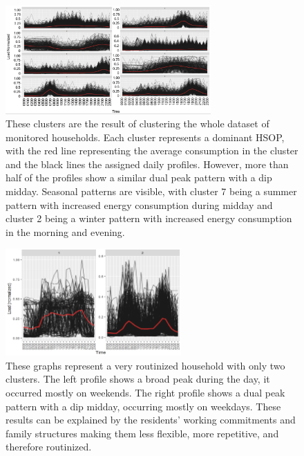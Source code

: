 \begin{figure}
    \centering
    \includegraphics[width=0.7\textwidth]{figures/malatesta_hsop/malatesta_clusteringWholeDataset.png}
    \caption{These clusters are the result of clustering the whole dataset of monitored households.
    Each cluster represents a dominant HSOP, with the red line representing the average consumption in the cluster and the black lines the assigned daily profiles.
    However, more than half of the profiles show a similar dual peak pattern with a dip midday.
    Seasonal patterns are visible, with cluster 7 being a summer pattern with increased energy consumption during midday and cluster 2 being a winter pattern with increased energy consumption in the morning and evening.
    }
    \label{fig:clustering_whole_dataset}
\end{figure}

\begin{figure}
    \centering
    \includegraphics[width=0.6\textwidth]{figures/malatesta_hsop/malatesta_routinisedHousehold.jpg}
    \caption{These graphs represent a very routinized household with only two clusters.
    The left profile shows a broad peak during the day, it occurred mostly on weekends.
    The right profile shows a dual peak pattern with a dip midday, occurring mostly on weekdays.
    These results can be explained by the residents' working commitments and family structures making them less flexible, more repetitive, and therefore routinized.
    }
    \label{fig:routinized_household}
\end{figure}

